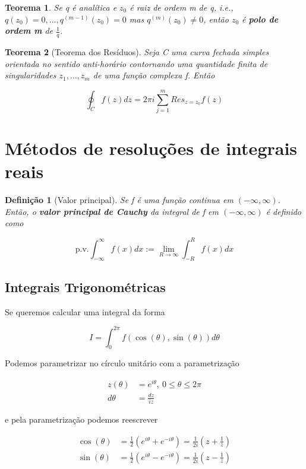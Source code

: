 \documentclass{article}
\newtheorem{theorem}{Teorema}
\newtheorem{definition}{Definição}
\begin{document}
\begin{theorem}
Se q é analítica e $z_0$ é raiz de ordem m de q, i.e., $q(z_0) = 0, \ldots, q^{(m - 1)}(z_0) = 0$ mas $q^{(m)}(z_0) \neq 0$, então $z_0$ é \textbf{polo de ordem m} de $\frac{1}{q}$.
\end{theorem}

\begin{theorem}[Teorema dos Resíduos]
Seja C uma curva fechada simples orientada no sentido anti-horário contornando uma quantidade finita de singularidades $z_1, \ldots, z_m$ de uma função complexa f. Então

$$\oint_C f(z) d z = 2 \pi i \sum_{j = 1}^m Res_{z = z_0} f(z)$$
\end{theorem}

\section*{Métodos de resoluções de integrais reais}
\label{s10}
\begin{definition}[Valor principal]
Se f é uma função continua em $(- \infty, \infty)$. Então, o \textbf{valor principal de Cauchy} da integral de f em $(- \infty, \infty)$ é definido como

$$\mathrm{p.v.} \int_{-\infty}^\infty f(x) d x := \lim_{R \to \infty} \int_{-R}^R f(x) d x$$
\end{definition}

\subsection*{Integrais Trigonométricas}
Se queremos calcular uma integral da forma

$$I = \int_0^{2\pi} f(\cos(\theta), \sin(\theta)) d \theta $$

Podemos parametrizar no círculo unitário com a parametrização

\begin{align*}
    z(\theta) &= e^{i \theta},\ 0 \leq \theta \leq 2 \pi \\
    d \theta &= \frac{d z}{i z}
\end{align*}

e pela parametrização podemos reescrever 

\begin{align*}
    \cos(\theta) &= \frac{1}{2} (e^{i \theta} + e^{ - i \theta}) = \frac{1}{2 i} \left(z + \frac{1}{z} \right) \\
    \sin(\theta) &= \frac{1}{2} (e^{i \theta} - e^{ - i \theta}) = \frac{1}{2 i} \left(z - \frac{1}{z} \right)
\end{align*}
\end{document}
